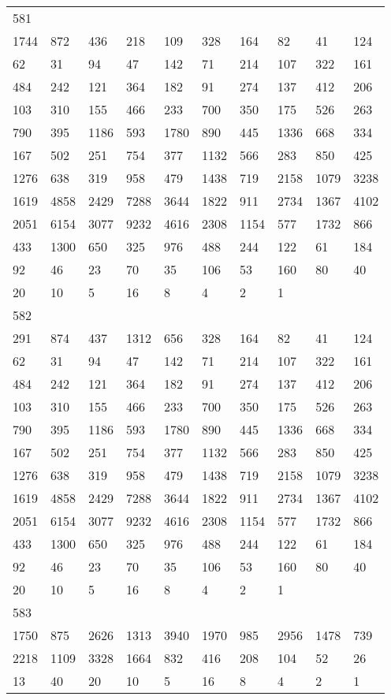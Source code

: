 \begin{longtable}{*{10}{l}}
581&&&&&&&&&\\
1744& 872& 436& 218& 109& 328& 164& 82& 41& 124\\
62& 31& 94& 47& 142& 71& 214& 107& 322& 161\\
484& 242& 121& 364& 182& 91& 274& 137& 412& 206\\
103& 310& 155& 466& 233& 700& 350& 175& 526& 263\\
790& 395& 1186& 593& 1780& 890& 445& 1336& 668& 334\\
167& 502& 251& 754& 377& 1132& 566& 283& 850& 425\\
1276& 638& 319& 958& 479& 1438& 719& 2158& 1079& 3238\\
1619& 4858& 2429& 7288& 3644& 1822& 911& 2734& 1367& 4102\\
2051& 6154& 3077& 9232& 4616& 2308& 1154& 577& 1732& 866\\
433& 1300& 650& 325& 976& 488& 244& 122& 61& 184\\
92& 46& 23& 70& 35& 106& 53& 160& 80& 40\\
20& 10& 5& 16& 8& 4& 2& 1& \\

582&&&&&&&&&\\
291& 874& 437& 1312& 656& 328& 164& 82& 41& 124\\
62& 31& 94& 47& 142& 71& 214& 107& 322& 161\\
484& 242& 121& 364& 182& 91& 274& 137& 412& 206\\
103& 310& 155& 466& 233& 700& 350& 175& 526& 263\\
790& 395& 1186& 593& 1780& 890& 445& 1336& 668& 334\\
167& 502& 251& 754& 377& 1132& 566& 283& 850& 425\\
1276& 638& 319& 958& 479& 1438& 719& 2158& 1079& 3238\\
1619& 4858& 2429& 7288& 3644& 1822& 911& 2734& 1367& 4102\\
2051& 6154& 3077& 9232& 4616& 2308& 1154& 577& 1732& 866\\
433& 1300& 650& 325& 976& 488& 244& 122& 61& 184\\
92& 46& 23& 70& 35& 106& 53& 160& 80& 40\\
20& 10& 5& 16& 8& 4& 2& 1& \\

583&&&&&&&&&\\
1750& 875& 2626& 1313& 3940& 1970& 985& 2956& 1478& 739\\
2218& 1109& 3328& 1664& 832& 416& 208& 104& 52& 26\\
13& 40& 20& 10& 5& 16& 8& 4& 2& 1\\


\end{longtable}
